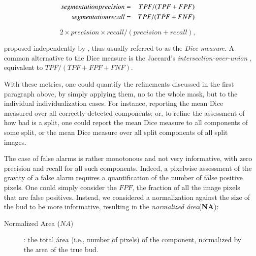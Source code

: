 \documentclass[a4paper,authoryear,review]{elsarticle}
\begin{document}
\begin{eqnarray} 
segmentation\-precision &=& TPF / (TPF + FPF) \\
segmentation\-recall &=& TPF / (TPF + FNF)
\end{eqnarray}

\begin{equation} 
2 \times precision \times recall / (precision + recall),
\end{equation}

proposed independently by \citet{dice1945measures}, thus usually referred to as the \emph{Dice measure}. A common alternative to the Dice measure is the  Jaccard’s \emph{intersection-over-union} \citep{jaccard1912distribution}, 
equivalent to $TPF / (TPF+FPF+FNF)$. 

With these metrics, one could quantify the refinements discussed in the first paragraph above, by simply applying them, no to the whole mask, but to the individual individualization cases. For instance, reporting the mean Dice measured over all correctly detected components; or, to refine the assessment of how bad is a split, one could report the mean Dice measure to all components of some split, or the mean Dice measure over all split components of all split images. 

The case of false alarms is rather monotonous and not very informative, with zero precision and recall for all such components. Indeed, a pixelwise assessment of the gravity of a false alarm requires a quantification of the number of false positive pixels. One could simply consider the $FPF$, the fraction of all the image pixels that are false positives. Instead, we considered a normalization against the size of the bud to be more informative, resulting in the \emph{normalized área}(\textbf{NA}):

\begin{description}
	\item[Normalized Area ($NA$)]: the total área (i.e., number of pixels) of the component, normalized by the area of the true bud. 
\end{description}
\end{document}
